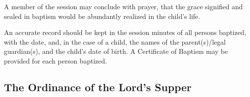 \begin{outerlst}[left=0pt,labelsep=0pt]
\begin{innerlst}[resume*]
      \item A member of the session may conclude with prayer, that the grace signified and sealed in baptism would be abundantly realized in the child's life. 
      \item An accurate record should be kept in the session minutes of all persons baptized, with the date, and, in the case of a child, the names of the parent(s)/legal guardian(s), and the child's date of birth. A Certificate of Baptism may be provided for each person baptized. 
\end{innerlst}

\subsection{The Ordinance of the Lord's Supper} 


\end{outerlst}
